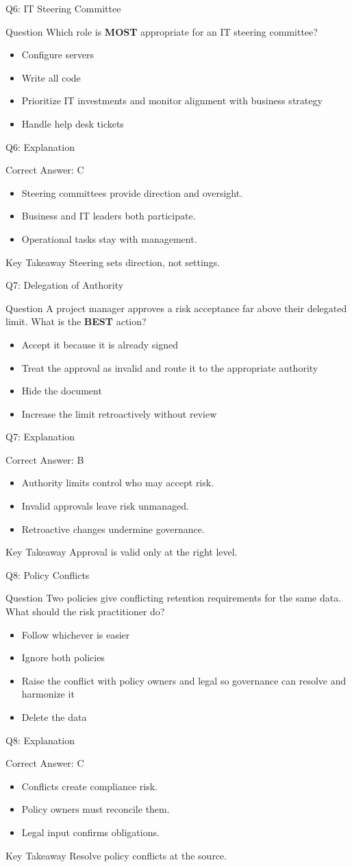 \documentclass[aspectratio=169]{beamer}
\newcommand{\hq}[7]{%
	\begin{frame}{Q#1: #2}
		\begin{block}{Question}
			#3
		\end{block}
		\begin{itemize}
			#4
		\end{itemize}
	\end{frame}
	\begin{frame}{Q#1: Explanation}
		\begin{block}{Correct Answer: #5}
			\begin{itemize}
				#6
			\end{itemize}
		\end{block}
		\begin{alertblock}{Key Takeaway}
			#7
		\end{alertblock}
	\end{frame}
}
\begin{document}
	\hq{6}{IT Steering Committee}
	{Which role is \textbf{MOST} appropriate for an IT steering committee?}
	{\item[\textbf{(A)}] Configure servers
		\item[\textbf{(B)}] Write all code
		\item[\textbf{(C)}] Prioritize IT investments and monitor alignment with business strategy
		\item[\textbf{(D)}] Handle help desk tickets}
	{C}
	{\item Steering committees provide direction and oversight.
		\item Business and IT leaders both participate.
		\item Operational tasks stay with management.}
	{Steering sets direction, not settings.}
	
	\hq{7}{Delegation of Authority}
	{A project manager approves a risk acceptance far above their delegated limit. What is the \textbf{BEST} action?}
	{\item[\textbf{(A)}] Accept it because it is already signed
		\item[\textbf{(B)}] Treat the approval as invalid and route it to the appropriate authority
		\item[\textbf{(C)}] Hide the document
		\item[\textbf{(D)}] Increase the limit retroactively without review}
	{B}
	{\item Authority limits control who may accept risk.
		\item Invalid approvals leave risk unmanaged.
		\item Retroactive changes undermine governance.}
	{Approval is valid only at the right level.}
	
	\hq{8}{Policy Conflicts}
	{Two policies give conflicting retention requirements for the same data. What should the risk practitioner do?}
	{\item[\textbf{(A)}] Follow whichever is easier
		\item[\textbf{(B)}] Ignore both policies
		\item[\textbf{(C)}] Raise the conflict with policy owners and legal so governance can resolve and harmonize it
		\item[\textbf{(D)}] Delete the data}
	{C}
	{\item Conflicts create compliance risk.
		\item Policy owners must reconcile them.
		\item Legal input confirms obligations.}
	{Resolve policy conflicts at the source.}
	
\end{document}
